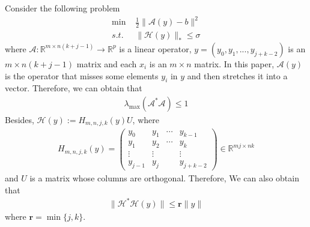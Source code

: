\documentclass{article}
\numberwithin{equation}{section}
\begin{document}
Consider the following problem
\begin{align} \label{Hankel Matrix}
    \min\limits \hspace{4pt}&\frac{1}{2}\|\mathcal{A}(y)-b\rVert^2 \nonumber\\
    s.t. \hspace{4pt} &\| \mathcal{H}(y) \rVert_* \leq \sigma   
\end{align}
where $\mathcal{A}: \mathbb{R}^{m\times n(k+j-1)} \rightarrow \mathbb{R}^p$ is a linear operator,   
$y =\left(y_0, y_1,...,y_{j+k-2}\right)$ is an $m \times n(k+j-1)$ matrix and each
$x_i$ is an $m\times n$ matrix. In this paper, $\mathcal{A}(y)$ is the operator that misses some elements
$y_i$ in $y$ and then stretches it into a vector.  Therefore, we can obtain that
\begin{align}
    \lambda_{\max}(\mathcal{A}^*\mathcal{A}) \leq 1 \nonumber
\end{align}
Besides, $\mathcal{H}(y) := H_{m, n, j, k}(y)U$, where
\begin{align}
    H_{m,n,j,k}(y) = \left(
        \begin{array}{cccc}
            y_0 & y_1 & \cdots &y_{k-1} \\
            y_1 & y_2 & \cdots &y_{k} \\
            \vdots & \vdots &  &\vdots \\
            y_{j-1} &y_{j}  &  &y_{j+k-2} 
        \end{array} \nonumber
    \right) \in \mathbb{R}^{mj\times nk}
\end{align}
and
$U$ is a matrix whose columns are orthogonal. Therefore, We can also obtain that 
\begin{align}
    \| \mathcal{H}^*\mathcal{H}(y) \rVert \leq \mathbf{r}\| y\rVert \nonumber
\end{align}
where $\mathbf{r} = \min\{ j,k\}$.
\end{document}
